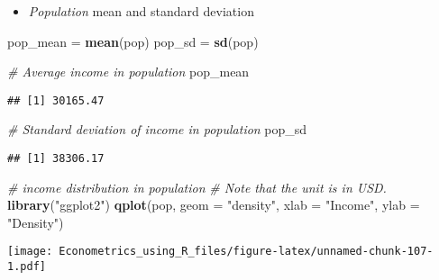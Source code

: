 \documentclass[]{book}
\newenvironment{Shaded}{\begin{snugshade}}{\end{snugshade}}
\newcommand{\CommentTok}[1]{\textcolor[rgb]{0.56,0.35,0.01}{\textit{#1}}}
\newcommand{\DataTypeTok}[1]{\textcolor[rgb]{0.13,0.29,0.53}{#1}}
\newcommand{\KeywordTok}[1]{\textcolor[rgb]{0.13,0.29,0.53}{\textbf{#1}}}
\newcommand{\NormalTok}[1]{#1}
\newcommand{\OperatorTok}[1]{\textcolor[rgb]{0.81,0.36,0.00}{\textbf{#1}}}
\newcommand{\StringTok}[1]{\textcolor[rgb]{0.31,0.60,0.02}{#1}}
\providecommand{\tightlist}{%
  \setlength{\itemsep}{0pt}\setlength{\parskip}{0pt}}
\begin{document}
\begin{Shaded}
\end{Shaded}

\begin{itemize}
\tightlist
\item
  \emph{Population} mean and standard deviation
\end{itemize}

\begin{Shaded}
\begin{Highlighting}[]
\NormalTok{pop_mean =}\StringTok{ }\KeywordTok{mean}\NormalTok{(pop)}
\NormalTok{pop_sd   =}\StringTok{ }\KeywordTok{sd}\NormalTok{(pop)}

\CommentTok{# Average income in population}
\NormalTok{pop_mean}
\end{Highlighting}
\end{Shaded}

\begin{verbatim}
## [1] 30165.47
\end{verbatim}

\begin{Shaded}
\begin{Highlighting}[]
\CommentTok{# Standard deviation of income in population}
\NormalTok{pop_sd}
\end{Highlighting}
\end{Shaded}

\begin{verbatim}
## [1] 38306.17
\end{verbatim}

\begin{Shaded}
\begin{Highlighting}[]
\CommentTok{# income distribution in population}
\CommentTok{# Note that the unit is in USD.}
\KeywordTok{library}\NormalTok{(}\StringTok{"ggplot2"}\NormalTok{)}
\KeywordTok{qplot}\NormalTok{(pop, }\DataTypeTok{geom =} \StringTok{"density"}\NormalTok{, }
      \DataTypeTok{xlab =} \StringTok{"Income"}\NormalTok{,}
      \DataTypeTok{ylab =} \StringTok{"Density"}\NormalTok{)}
\end{Highlighting}
\end{Shaded}

\texttt{[image: Econometrics\_using\_R\_files/figure-latex/unnamed-chunk-107-1.pdf]}
\end{document}
